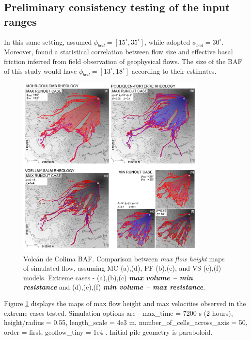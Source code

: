 \documentclass{article}
\begin{document}
\subsection{Preliminary consistency testing of the input ranges}
In this same setting, \cite{Dalbey2008} assumed $\phi_{bed}=[15^\mathrm{\circ}, 35^\mathrm{\circ}]$, while \citep{Capra2011} adopted $\phi_{bed}=30^\mathrm{\circ}$. Moreover, \cite{Spiller2014,Bayarri2015,Ogburn2016} found a statistical correlation between flow size and effective basal friction inferred from field observation of geophysical flows. The size of the BAF of this study would have $\phi_{bed}=[13^\mathrm{\circ}, 18^\mathrm{\circ}]$ according to their estimates.
\begin{figure}[H]
         \centering
        \includegraphics[width=0.85\textwidth]{Figures/ExtremeMaps.jpg}
        \caption{Volc\'an de Colima BAF. Comparison between \emph{max flow height} maps of simulated flow, assuming MC (a),(d), PF (b),(e), and VS (c),(f) models. Extreme cases - (a),(b),(c) \emph{\textbf{max volume -- min resistance}} and (d),(e),(f) \emph{\textbf{min volume -- max resistance}}.}
        \label{Colima-MaxMinExtents}
\end{figure}
Figure \ref{Colima-MaxMinExtents} displays the maps of max flow height and max velocities observed in the extreme cases tested. Simulation options are - max\_time = 7200 s (2 hours), height/radius = 0.55, length\_scale = 4e3 m, number\_of\_cells\_across\_axis = 50, order = first, geoflow\_tiny = 1e4 \citep{Patra2005,Aghakhani2016}. Initial pile geometry is paraboloid.
\end{document}
